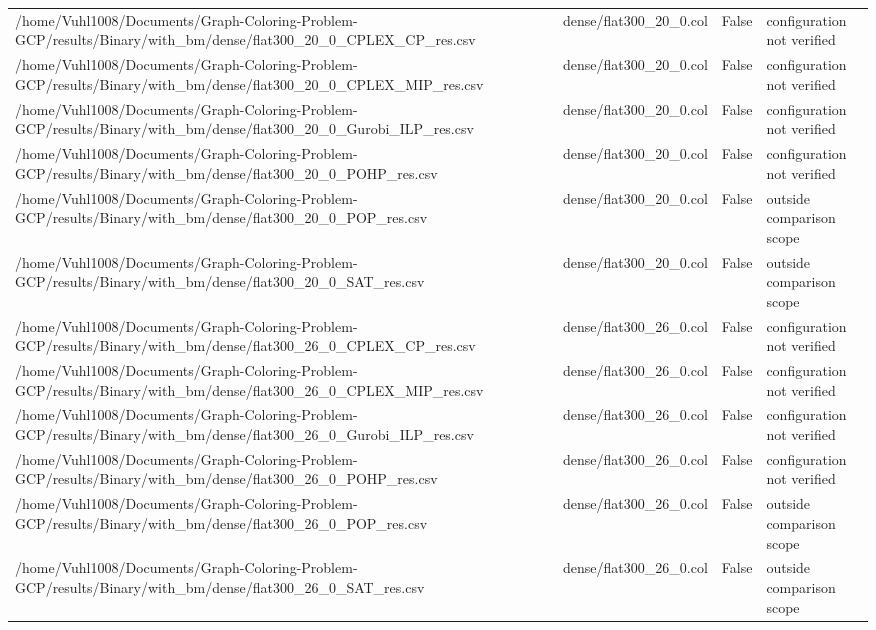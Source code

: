 \begin{table}[htbp]
\begin{tabular}{llll}
/home/Vuhl1008/Documents/Graph-Coloring-Problem-GCP/results/Binary/with\_bm/dense/flat300\_20\_0\_CPLEX\_CP\_res.csv & dense/flat300\_20\_0.col & False & configuration not verified \\
/home/Vuhl1008/Documents/Graph-Coloring-Problem-GCP/results/Binary/with\_bm/dense/flat300\_20\_0\_CPLEX\_MIP\_res.csv & dense/flat300\_20\_0.col & False & configuration not verified \\
/home/Vuhl1008/Documents/Graph-Coloring-Problem-GCP/results/Binary/with\_bm/dense/flat300\_20\_0\_Gurobi\_ILP\_res.csv & dense/flat300\_20\_0.col & False & configuration not verified \\
/home/Vuhl1008/Documents/Graph-Coloring-Problem-GCP/results/Binary/with\_bm/dense/flat300\_20\_0\_POHP\_res.csv & dense/flat300\_20\_0.col & False & configuration not verified \\
/home/Vuhl1008/Documents/Graph-Coloring-Problem-GCP/results/Binary/with\_bm/dense/flat300\_20\_0\_POP\_res.csv & dense/flat300\_20\_0.col & False & outside comparison scope \\
/home/Vuhl1008/Documents/Graph-Coloring-Problem-GCP/results/Binary/with\_bm/dense/flat300\_20\_0\_SAT\_res.csv & dense/flat300\_20\_0.col & False & outside comparison scope \\
/home/Vuhl1008/Documents/Graph-Coloring-Problem-GCP/results/Binary/with\_bm/dense/flat300\_26\_0\_CPLEX\_CP\_res.csv & dense/flat300\_26\_0.col & False & configuration not verified \\
/home/Vuhl1008/Documents/Graph-Coloring-Problem-GCP/results/Binary/with\_bm/dense/flat300\_26\_0\_CPLEX\_MIP\_res.csv & dense/flat300\_26\_0.col & False & configuration not verified \\
/home/Vuhl1008/Documents/Graph-Coloring-Problem-GCP/results/Binary/with\_bm/dense/flat300\_26\_0\_Gurobi\_ILP\_res.csv & dense/flat300\_26\_0.col & False & configuration not verified \\
/home/Vuhl1008/Documents/Graph-Coloring-Problem-GCP/results/Binary/with\_bm/dense/flat300\_26\_0\_POHP\_res.csv & dense/flat300\_26\_0.col & False & configuration not verified \\
/home/Vuhl1008/Documents/Graph-Coloring-Problem-GCP/results/Binary/with\_bm/dense/flat300\_26\_0\_POP\_res.csv & dense/flat300\_26\_0.col & False & outside comparison scope \\
/home/Vuhl1008/Documents/Graph-Coloring-Problem-GCP/results/Binary/with\_bm/dense/flat300\_26\_0\_SAT\_res.csv & dense/flat300\_26\_0.col & False & outside comparison scope \\

\end{tabular}
\end{table}
